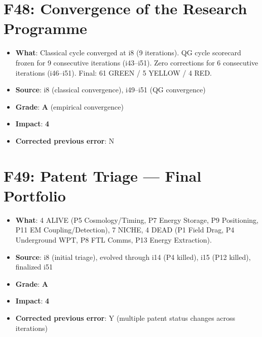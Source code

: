 \documentclass[11pt,a4paper]{article}
\newcommand{\grade}[1]{\textbf{#1}}
\newcommand{\impact}[1]{\textbf{#1}}
\begin{document}
\section{F48: Convergence of the Research Programme}
\begin{itemize}[nosep]
\item \textbf{What}: Classical cycle converged at i8 (9 iterations). QG cycle scorecard frozen for 9 consecutive iterations (i43--i51). Zero corrections for 6 consecutive iterations (i46--i51). Final: 61 GREEN / 5 YELLOW / 4 RED.
\item \textbf{Source}: i8 (classical convergence), i49--i51 (QG convergence)
\item \textbf{Grade}: \grade{A} (empirical convergence)
\item \textbf{Impact}: \impact{4}
\item \textbf{Corrected previous error}: N
\end{itemize}

\section{F49: Patent Triage --- Final Portfolio}
\begin{itemize}[nosep]
\item \textbf{What}: 4 ALIVE (P5 Cosmology/Timing, P7 Energy Storage, P9 Positioning, P11 EM Coupling/Detection), 7 NICHE, 4 DEAD (P1 Field Drag, P4 Underground WPT, P8 FTL Comms, P13 Energy Extraction).
\item \textbf{Source}: i8 (initial triage), evolved through i14 (P4 killed), i15 (P12 killed), finalized i51
\item \textbf{Grade}: \grade{A}
\item \textbf{Impact}: \impact{4}
\item \textbf{Corrected previous error}: Y (multiple patent status changes across iterations)
\end{itemize}

\end{document}
